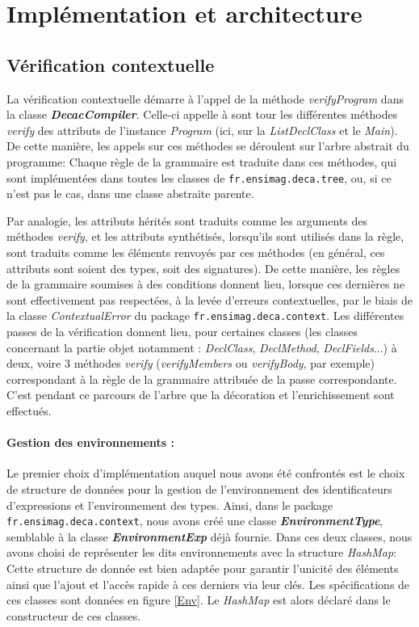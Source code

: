 \documentclass{article}
\begin{document}
\section{Implémentation et architecture}
\subsection{Vérification contextuelle}

    La vérification contextuelle démarre à l'appel de la méthode \textit{verifyProgram} dans la  classe \textbf{\textit{DecacCompiler}}.
    Celle-ci appelle à sont tour les différentes méthodes \textit{verify} des attributs de l'instance \textit{Program} (ici, sur la \textit{ListDeclClass} et le \textit{Main}). De cette manière, les appels sur ces méthodes se déroulent sur l'arbre abstrait du programme: Chaque règle de la grammaire est traduite dans ces méthodes, qui sont implémentées dans toutes les classes de \texttt{fr.ensimag.deca.tree}, ou, si ce n'est pas le cas, dans une classe abstraite parente.

    Par analogie, les attributs hérités sont traduits comme les arguments des méthodes \textit{verify}, et les attributs synthétisés, lorsqu'ils sont utilisés dans la règle, sont traduits comme les éléments renvoyés par ces méthodes (en général, ces attributs sont soient des types, soit des signatures).
    De cette manière, les règles de la grammaire soumises à des conditions donnent lieu, lorsque ces dernières ne sont effectivement pas respectées, à la levée d'erreurs contextuelles, par le biais de la classe \textit{ContextualError} du package \texttt{fr.ensimag.deca.context}.
    Les différentes passes de la vérification donnent lieu, pour certaines classes (les classes concernant la partie objet notamment : \textit{DeclClass}, \textit{DeclMethod}, \textit{DeclFields}...) à deux, voire 3 méthodes \textit{verify} (\textit{verifyMembers} ou \textit{verifyBody}, par exemple) correspondant à la règle de la grammaire attribuée de la passe correspondante.
    C'est pendant ce parcours de l'arbre que la décoration et l'enrichissement sont effectués.


   \paragraph{Gestion des environnements :} 
    Le premier choix d'implémentation auquel nous avons été confrontés est le choix de structure de données pour la gestion de l'environnement des identificateurs d'expressions et l'environnement des types.
    Ainsi, dans le package \texttt{fr.ensimag.deca.context}, nous avons créé une classe \textbf{\textit{EnvironmentType}}, semblable à la classe \textbf{\textit{EnvironmentExp}} déjà fournie.
    Dans ces deux classes, nous avons choisi de représenter les dits environnements avec la structure \textit{HashMap}:
    Cette structure de donnée est bien adaptée pour garantir l'unicité des éléments ainsi que l'ajout et l'accès rapide à ces derniers via leur clés.
    Les spécifications de ces classes sont données en figure \ref{Env}. Le \textit{HashMap} est alors déclaré dans le constructeur de ces classes.
\end{document}
